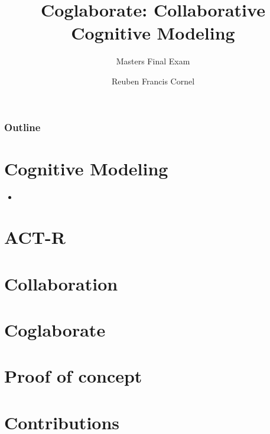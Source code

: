 \documentclass[notes]{beamer}
\title{Coglaborate: Collaborative Cognitive Modeling}
\subtitle{Masters Final Exam}
\author{Reuben Francis Cornel}
\institute{Knowledge Discovery Lab \\ North Carolina State University}
\begin{document}
\begin{frame}
  \titlepage
\end{frame}

\begin{frame}
  \frametitle{Outline}
  \tableofcontents
\end{frame}


\section{Cognitive Modeling}
\begin{frame}
  \begin{itemize}
  \item 
  \end{itemize}
\end{frame}

\section{ACT-R}

\section{Collaboration}

\section{Coglaborate}

\section{Proof of concept}

\section{Contributions}




\end{document}
